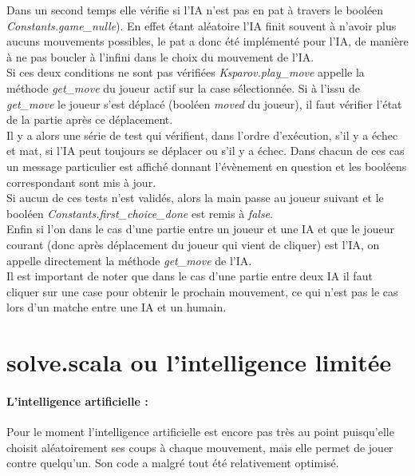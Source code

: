 \documentclass[a4paper]{article}
\begin{document}
Dans un second temps elle vérifie si l'IA n'est pas en pat à travers le booléen \textit{Constants.game\_nulle}). En effet étant aléatoire l'IA finit souvent à n'avoir plus aucuns mouvements possibles, le pat a donc été implémenté pour l'IA, de manière à ne pas boucler à l'infini dans le choix du mouvement de l'IA. \\

Si ces deux conditions ne sont pas vérifiées \textit{Ksparov.play\_move} appelle la méthode \textit{get\_move} du joueur actif sur la case sélectionnée. Si à l'issu de \textit{get\_move} le joueur s'est déplacé (booléen \textit{moved} du joueur), il faut vérifier l'état de la partie après ce déplacement. \\ 

Il y a alors une série de test qui vérifient, dans l'ordre d'exécution, s'il y a échec et mat, si l'IA peut toujours se déplacer ou s'il y a échec. Dans chacun de ces cas un message particulier est affiché donnant l'évènement en question et les booléens correspondant sont mis à jour. \\ 

Si aucun de ces tests n'est validés, alors la main passe au joueur suivant et le booléen \textit{Constants.first\_choice\_done} est remis à \textit{false}.\\

Enfin si l'on dans le cas d'une partie entre un joueur et une IA et que le joueur courant (donc après déplacement du joueur qui vient de cliquer) est l'IA, on appelle directement la méthode \textit{get\_move} de l'IA. \\ 

Il est important de noter que dans le cas d'une partie entre deux IA il faut cliquer sur une case pour obtenir le prochain mouvement, ce qui n'est pas le cas lors d'un matche entre une IA et un humain. 

\section{solve.scala ou l'intelligence limitée}

\paragraph{L'intelligence artificielle :}Pour le moment l'intelligence artificielle est encore pas très au point puisqu'elle choisit aléatoirement ses coups à chaque mouvement, mais elle permet de jouer contre quelqu'un. Son code a malgré tout été relativement optimisé. 
\end{document}
